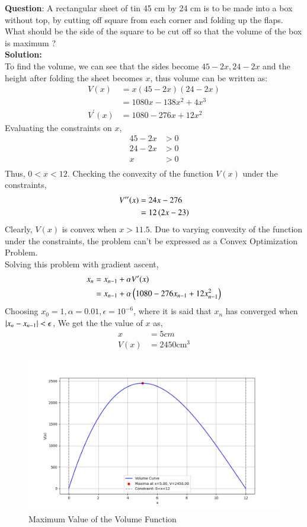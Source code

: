 \documentclass[journal]{IEEEtran}
\begin{document}
	
	\textbf{Question}:\newline
	A rectangular sheet of tin 45 cm by 24 cm is to be made into a box without top,
	by cutting off square from each corner and folding up the flaps. What should be
	the side of the square to be cut off so that the volume of the box is maximum ? \\
	\textbf{Solution: }\\
	To find the volume, we can see that the sides become $45-2x , 24-2x$ and the height after folding the sheet becomes $x$, thus volume can be written as:
	\begin{align}
		V(x) &= x(45-2x)(24-2x) \\ 
		&= 1080x - 138x^2 + 4x^3 \\		
		V^\prime(x) &= 1080 - 276x + 12x^2
	\end{align}
	Evaluating the constraints on $x$, 
	\begin{align}
		45 - 2x &> 0 \\ 24 - 2x&>0 \\ x &> 0\\
	\end{align}
	Thus, $0<x<12$. Checking the convexity of the function $V(x)$ under the constraints,
	\begin{align}
		V^{\prime\prime}(x) &= 24x - 276  \\ &= 12\left(2x-23\right)
	\end{align}
	Clearly, $V(x)$ is convex when $x>11.5$. Due to varying convexity of the function under the constraints, the problem can't be expressed as a Convex Optimization Problem. \\
	Solving this problem with gradient ascent, 
	\begin{align}
		x_n &= x_{n-1} + \alpha V^\prime(x) \\
		&= x_{n-1} + \alpha\left(1080 - 276 x_{n-1} + 12 x_{n-1}^2\right)
	\end{align}
	Choosing $x_0 = 1, \alpha = 0.01, \epsilon = 10^{-6}$, where it is said that $x_n$ has converged when $\left\vert x_n - x_{n-1}\right\vert < \epsilon$, We get the the value of $x$ as,
	\begin{align}
		x &= 5 cm  \\ 
		V(x) &= 2450 \text{cm}^3
	\end{align}
	\begin{figure}[h!]
		\centering
		\includegraphics[width=\columnwidth]{figs/fig1.png}
		\caption{Maximum Value of the Volume Function}
		\label{stemplot}
	\end{figure}
	
\end{document}
